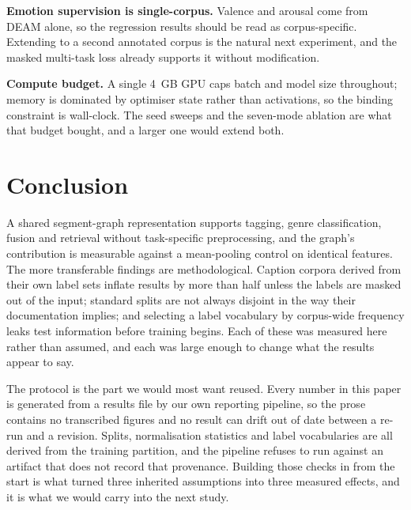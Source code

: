 \documentclass[conference]{IEEEtran}
\begin{document}
\textbf{Emotion supervision is single-corpus.} Valence and arousal come from
DEAM alone, so the regression results should be read as corpus-specific.
Extending to a second annotated corpus is the natural next experiment, and the
masked multi-task loss already supports it without modification.

\textbf{Compute budget.} A single 4~GB GPU caps batch and model size throughout;
memory is dominated by optimiser state rather than activations, so the binding
constraint is wall-clock. The seed sweeps and the seven-mode ablation are what
that budget bought, and a larger one would extend both.

\section{Conclusion}
A shared segment-graph representation supports tagging, genre classification,
fusion and retrieval without task-specific preprocessing, and the graph's
contribution is measurable against a mean-pooling control on identical features.
The more transferable findings are methodological. Caption corpora derived from
their own label sets inflate results by more than half unless the labels are
masked out of the input; standard splits are not always disjoint in the way
their documentation implies; and selecting a label vocabulary by corpus-wide
frequency leaks test information before training begins. Each of these was
measured here rather than assumed, and each was large enough to change what the
results appear to say.

The protocol is the part we would most want reused. Every number in this paper
is generated from a results file by our own reporting pipeline, so the prose
contains no transcribed figures and no result can drift out of date between a
re-run and a revision. Splits, normalisation statistics and label vocabularies
are all derived from the training partition, and the pipeline refuses to run
against an artifact that does not record that provenance. Building those checks
in from the start is what turned three inherited assumptions into three measured
effects, and it is what we would carry into the next study.
\end{document}

